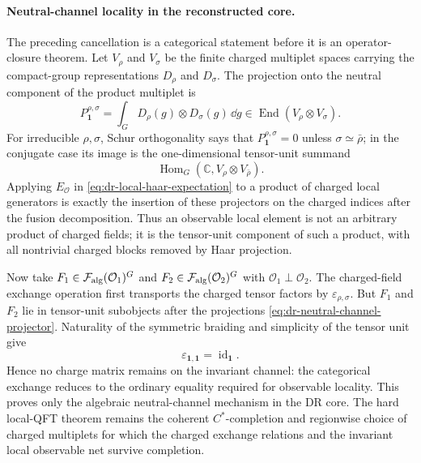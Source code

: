 \paragraph{Neutral-channel locality in the reconstructed core.}
The preceding cancellation is a categorical statement before it is an
operator-closure theorem.  Let \(V_\rho\) and \(V_\sigma\) be the finite
charged multiplet spaces carrying the compact-group representations
\(D_\rho\) and \(D_\sigma\).  The projection onto the neutral component of the
product multiplet is
\begin{equation}
  P_{\mathbf1}^{\rho,\sigma}
  =
  \int_G D_\rho(g)\otimes D_\sigma(g)\,\dd g
  \in \operatorname{End}(V_\rho\otimes V_\sigma).
  \label{eq:dr-neutral-channel-projector}
\end{equation}
For irreducible \(\rho,\sigma\), Schur orthogonality says that
\(P_{\mathbf1}^{\rho,\sigma}=0\) unless
\(\sigma\simeq\bar\rho\); in the conjugate case its image is the
one-dimensional tensor-unit summand
\[
  \operatorname{Hom}_G(\mathbb C,V_\rho\otimes V_{\bar\rho}) .
\]
Applying \(E_{\mathcal O}\) in
\eqref{eq:dr-local-haar-expectation} to a product of charged local
generators is exactly the insertion of these projectors on the charged
indices after the fusion decomposition.  Thus an observable local element is
not an arbitrary product of charged fields; it is the tensor-unit component
of such a product, with all nontrivial charged blocks removed by Haar
projection.

Now take \(F_1\in\mathcal F_{\rm alg}(\mathcal O_1)^G\) and
\(F_2\in\mathcal F_{\rm alg}(\mathcal O_2)^G\) with
\(\mathcal O_1\perp\mathcal O_2\).  The charged-field exchange operation
first transports the charged tensor factors by
\(\varepsilon_{\rho,\sigma}\).  But \(F_1\) and \(F_2\) lie in tensor-unit
subobjects after the projections
\eqref{eq:dr-neutral-channel-projector}.  Naturality of the symmetric
braiding and simplicity of the tensor unit give
\[
  \varepsilon_{\mathbf1,\mathbf1}=\operatorname{id}_{\mathbf1}.
\]
Hence no charge matrix remains on the invariant channel: the categorical
exchange reduces to the ordinary equality required for observable locality.
This proves only the algebraic neutral-channel mechanism in the DR core.  The
hard local-QFT theorem remains the coherent \(C^*\)-completion and regionwise
choice of charged multiplets for which the charged exchange relations and
the invariant local observable net survive completion.

